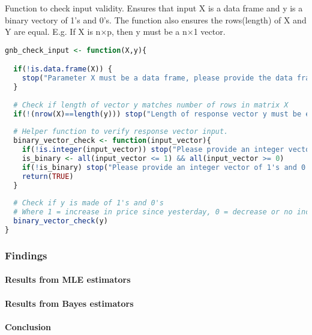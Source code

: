 \documentclass{article}
\begin{document}
Function to check input validity. Ensures that input X is a data frame and y is a binary vectory of 1's and 0's. The function also ensures the rows(length) of X and Y are equal. E.g. If X is n$\times$p, then y must be a n$\times$1 vector.
\begin{lstlisting}[language=R]
gnb_check_input <- function(X,y){

  if(!is.data.frame(X)) {
    stop("Parameter X must be a data frame, please provide the data frame whose columns are numeric variables and rows are observations")
  }
  
  # Check if length of vector y matches number of rows in matrix X
  if(!(nrow(X)==length(y))) stop("Length of response vector y must be equal to number of rows in X")
  
  # Helper function to verify response vector input.
  binary_vector_check <- function(input_vector){
    if(!is.integer(input_vector)) stop("Please provide an integer vector")    
    is_binary <- all(input_vector <= 1) && all(input_vector >= 0)    
    if(!is_binary) stop("Please provide an integer vector of 1's and 0's")
    return(TRUE)
  }
  
  # Check if y is made of 1's and 0's
  # Where 1 = increase in price since yesterday, 0 = decrease or no increase
  binary_vector_check(y)
}

\end{lstlisting}

\subsubsection{Findings}

\paragraph{Results from MLE estimators}


\paragraph{Results from Bayes estimators}

\paragraph{Conclusion}
\end{document}

